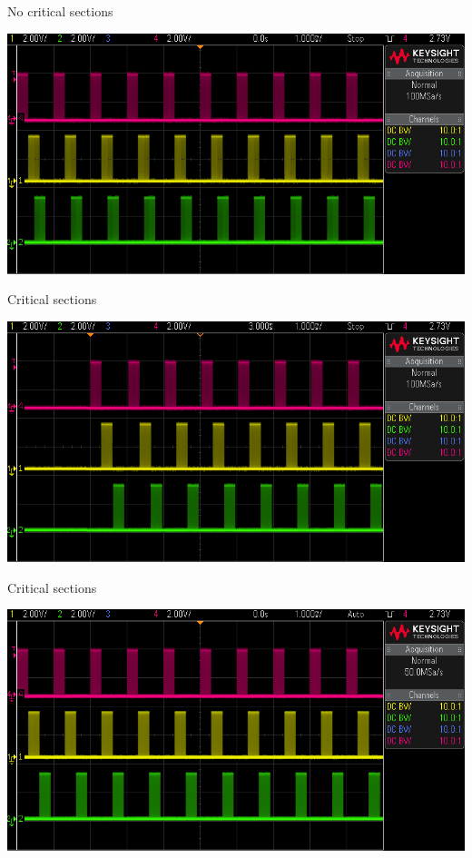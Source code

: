 \documentclass[
aspectratio=169,
]{beamer}
\begin{document}
\begin{frame}{No critical sections}
	\begin{center}
		\includegraphics[width=.9\textwidth]{img/scope_9b.png}
	\end{center}
\end{frame}

\begin{frame}{Critical sections}
	\begin{center}
		\includegraphics[width=.9\textwidth]{img/scope_9c.png}
	\end{center}
\end{frame}

\begin{frame}{Critical sections}
	\begin{center}
		\includegraphics[width=.9\textwidth]{img/scope_9d.png}
	\end{center}
\end{frame}
\end{document}
